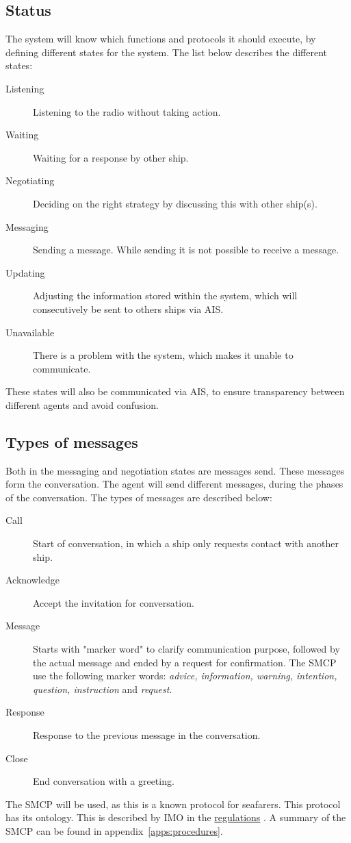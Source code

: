 \subsection{Status}
The system will know which functions and protocols it should execute, by defining different states for the system. The list below describes the different states:
\begin{description}
	\item [Listening] Listening to the radio without taking action.
	\item [Waiting] Waiting for a response by other ship.
	\item [Negotiating] Deciding on the right strategy by discussing this with other ship(s).
	\item [Messaging] Sending a message. While sending it is not possible to receive a message.
	\item [Updating] Adjusting the information stored within the system, which will consecutively be sent to others ships via \ac{AIS}.
	\item [Unavailable] There is a problem with the system, which makes it unable to communicate.
\end{description}
These states will also be communicated via \ac{AIS}, to ensure transparency between different agents and avoid confusion.

\subsection{Types of messages}
Both in the messaging and negotiation states are messages send. These messages form the conversation. The agent will send different messages, during the phases of the conversation. The types of messages are described below:
\begin{description}
	\item [Call] Start of conversation, in which a ship only requests contact with another ship.
	\item [Acknowledge] Accept the invitation for conversation.
	\item [Message] Starts with "marker word" to clarify communication purpose, followed by the actual message and ended by a request for confirmation. The \ac{SMCP} use the following marker words: \emph{advice, information, warning, intention, question, instruction} and \emph{request}.
	\item [Response] Response to the previous message in the conversation.
	\item [Close] End conversation with a greeting.
\end{description}
The \acf{SMCP} will be used, as this is a known protocol for seafarers. This protocol has its ontology. This is described by \ac{IMO} in the \href{https://puc.overheid.nl/doc/PUC_1418_14/1/#16830}{regulations} \cite{IMO2000}. A summary of the \ac{SMCP} can be found in appendix~\ref{apps:procedures}.

